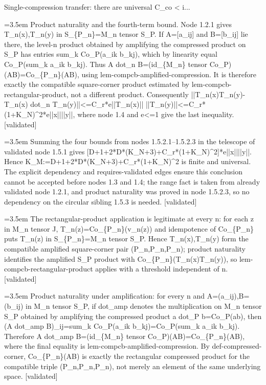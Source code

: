 \documentclass{article}
\newcommand{\step}[1]{\par\noindent\hangindent=3.5em\hangafter=1%
  \makebox[3.5em][l]{\textbf{#1.}}}
\newcommand{\steptag}[1]{\hfill{\small\textsf{[#1]}}}
\begin{document}
\begin{proofbox}{Single-compression transfer: there are universal C\_co < i...}
\step{1.5.2.3} Product naturality and the fourth-term bound. Node 1.2.1 gives T\_n(x),T\_n(y) in S\_\{P\_n\}=M\_n tensor S\_P. If A=[a\_ij] and B=[b\_ij] lie there, the level-n product obtained by amplifying the compressed product on S\_P has entries sum\_k Co\_P(a\_ik b\_kj), which by linearity equal Co\_P(sum\_k a\_ik b\_kj). Thus A dot\_n B=(id\_\{M\_n\} tensor Co\_P)(AB)=Co\_\{P\_n\}(AB), using lem-compcb-amplified-compression. It is therefore exactly the compatible square-corner product estimated by lem-compcb-rectangular-product, not a different product. Consequently ||T\_n(x)T\_n(y)-T\_n(x) dot\_n T\_n(y)||<=C\_r*e||T\_n(x)|| ||T\_n(y)||<=C\_r*(1+K\_N)\textasciicircum{}2*e||x||||y||, where node 1.4 and e<=1 give the last inequality. \steptag{validated} \\[4pt]
\step{1.5.2.4} Summing the four bounds from nodes 1.5.2.1--1.5.2.3 in the telescope of validated node 1.5.1 gives [D+1+2*D*(K\_N+3)+C\_r*(1+K\_N)\textasciicircum{}2]*e||x||||y||. Hence K\_M:=D+1+2*D*(K\_N+3)+C\_r*(1+K\_N)\textasciicircum{}2 is finite and universal. The explicit dependency and requires-validated edges ensure this conclusion cannot be accepted before nodes 1.3 and 1.4; the range fact is taken from already validated node 1.2.1, and product naturality was proved in node 1.5.2.3, so no dependency on the circular sibling 1.5.3 is needed. \steptag{validated} \\[4pt]
\step{1.5.3} The rectangular-product application is legitimate at every n: for each z in M\_n tensor J, T\_n(z)=Co\_\{P\_n\}(v\_n(z)) and idempotence of Co\_\{P\_n\} puts T\_n(z) in S\_\{P\_n\}=M\_n tensor S\_P. Hence T\_n(x),T\_n(y) form the compatible amplified square-corner pair (P\_n,P\_n,P\_n); product naturality identifies the amplified S\_P product with Co\_\{P\_n\}(T\_n(x)T\_n(y)), so lem-compcb-rectangular-product applies with a threshold independent of n. \steptag{validated} \\[6pt]
\step{1.5.3.1} Product naturality under amplification: for every n and A=(a\_ij),B=(b\_ij) in M\_n tensor S\_P, if dot\_amp denotes the multiplication on M\_n tensor S\_P obtained by amplifying the compressed product a dot\_P b=Co\_P(ab), then (A dot\_amp B)\_ij=sum\_k Co\_P(a\_ik b\_kj)=Co\_P(sum\_k a\_ik b\_kj). Therefore A dot\_amp B=(id\_\{M\_n\} tensor Co\_P)(AB)=Co\_\{P\_n\}(AB), where the final equality is lem-compcb-amplified-compression. By def-compressed-corner, Co\_\{P\_n\}(AB) is exactly the rectangular compressed product for the compatible triple (P\_n,P\_n,P\_n), not merely an element of the same underlying space. \steptag{validated} \\[4pt]

\end{proofbox}
\end{document}
